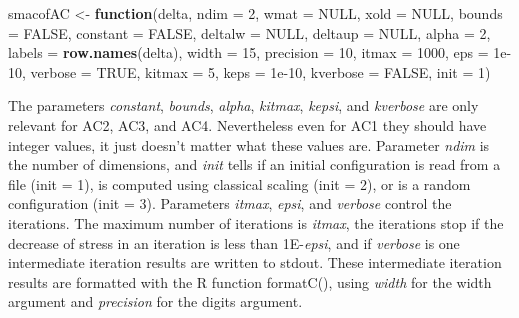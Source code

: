 \documentclass[
  12pt,
]{article}
\newenvironment{Shaded}{\begin{snugshade}}{\end{snugshade}}
\newcommand{\AttributeTok}[1]{\textcolor[rgb]{0.13,0.29,0.53}{#1}}
\newcommand{\ConstantTok}[1]{\textcolor[rgb]{0.56,0.35,0.01}{#1}}
\newcommand{\ControlFlowTok}[1]{\textcolor[rgb]{0.13,0.29,0.53}{\textbf{#1}}}
\newcommand{\DecValTok}[1]{\textcolor[rgb]{0.00,0.00,0.81}{#1}}
\newcommand{\FloatTok}[1]{\textcolor[rgb]{0.00,0.00,0.81}{#1}}
\newcommand{\FunctionTok}[1]{\textcolor[rgb]{0.13,0.29,0.53}{\textbf{#1}}}
\newcommand{\NormalTok}[1]{#1}
\newcommand{\OtherTok}[1]{\textcolor[rgb]{0.56,0.35,0.01}{#1}}
\begin{document}
\begin{Shaded}
\begin{Highlighting}[]
\NormalTok{smacofAC }\OtherTok{\textless{}{-}} \ControlFlowTok{function}\NormalTok{(delta,}
                     \AttributeTok{ndim =} \DecValTok{2}\NormalTok{,}
                     \AttributeTok{wmat =} \ConstantTok{NULL}\NormalTok{,}
                     \AttributeTok{xold =} \ConstantTok{NULL}\NormalTok{,}
                     \AttributeTok{bounds =} \ConstantTok{FALSE}\NormalTok{,}
                     \AttributeTok{constant =} \ConstantTok{FALSE}\NormalTok{,}
                     \AttributeTok{deltalw =} \ConstantTok{NULL}\NormalTok{,}
                     \AttributeTok{deltaup =} \ConstantTok{NULL}\NormalTok{,}
                     \AttributeTok{alpha =} \DecValTok{2}\NormalTok{,}
                     \AttributeTok{labels =} \FunctionTok{row.names}\NormalTok{(delta),}
                     \AttributeTok{width =} \DecValTok{15}\NormalTok{,}
                     \AttributeTok{precision =} \DecValTok{10}\NormalTok{,}
                     \AttributeTok{itmax =} \DecValTok{1000}\NormalTok{,}
                     \AttributeTok{eps =} \FloatTok{1e{-}10}\NormalTok{,}
                     \AttributeTok{verbose =} \ConstantTok{TRUE}\NormalTok{,}
                     \AttributeTok{kitmax =} \DecValTok{5}\NormalTok{,}
                     \AttributeTok{keps =} \FloatTok{1e{-}10}\NormalTok{,}
                     \AttributeTok{kverbose =} \ConstantTok{FALSE}\NormalTok{,}
                     \AttributeTok{init =} \DecValTok{1}\NormalTok{)}
\end{Highlighting}
\end{Shaded}

The parameters \emph{constant}, \emph{bounds}, \emph{alpha}, \emph{kitmax}, \emph{kepsi}, and \emph{kverbose} are only relevant for AC2, AC3, and AC4. Nevertheless even for AC1 they should have integer values, it just doesn't matter what these values are.
Parameter \emph{ndim} is the number of dimensions, and \emph{init} tells if an initial configuration
is read from a file (init = 1), is computed using classical scaling (init = 2), or is
a random configuration (init = 3). Parameters
\emph{itmax}, \emph{epsi}, and \emph{verbose} control the iterations. The maximum number of iterations
is \emph{itmax}, the iterations stop if the decrease of stress in an iteration is less than
1E-\emph{epsi}, and if \emph{verbose} is one intermediate iteration results are written to stdout.
These intermediate iteration results are formatted with the R function formatC(), using
\emph{width} for the width argument and \emph{precision} for the digits argument.
\end{document}
